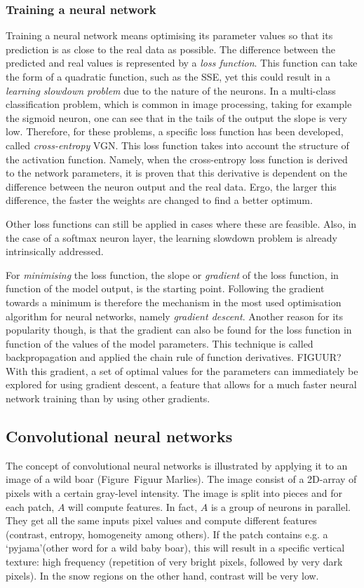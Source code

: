 \subsubsection{Training a neural network \label{subsubsec:training}}
Training a neural network means optimising its parameter values so that its prediction is as close to the real data as possible. The difference between the predicted and real values is represented by a \textit{loss function}. This function can take the form of a quadratic function, such as the SSE, yet this could result in a \textit{learning slowdown problem} due to the nature of the neurons. In a multi-class classification problem, which is common in image processing, taking for example the sigmoid neuron, one can see that in the tails of the output the slope is very low. Therefore, for these problems, a specific loss function has been developed, called \textit{cross-entropy} VGN. This loss function takes into account the structure of the activation function. Namely, when the cross-entropy loss function is derived to the network parameters, it is proven that this derivative is dependent on the difference between the neuron output and the real data. Ergo, the larger this difference, the faster the weights are changed to find a better optimum.


Other loss functions can still be applied in cases where these are feasible. Also, in the case of a softmax neuron layer, the learning slowdown problem is already intrinsically addressed.


For \textit{minimising} the loss function, the slope or \textit{gradient} of the loss function, in function of the model output, is the starting point. Following the gradient towards a minimum is therefore the mechanism in the most used optimisation algorithm for neural networks, namely \textit{gradient descent}. Another reason for its popularity though, is that the gradient can also be found for the loss function in function of the values of the model parameters. This technique is called backpropagation and applied the chain rule of function derivatives. FIGUUR? With this gradient, a set of optimal values for the parameters can immediately be explored for using gradient descent, a feature that allows for a much faster neural network training than by using other gradients.

\subsection{Convolutional neural networks \label{subsec:cnn}}
The concept of convolutional neural networks is illustrated by applying it to an image of a wild boar (Figure~Figuur Marlies). The image consist of a 2D-array of pixels with a certain gray-level intensity. The image is split into pieces and for each patch, $A$ will compute features. In fact, $A$ is a group of neurons in parallel. They get all the same inputs pixel values and compute different features (contrast, entropy, homogeneity among others). If the patch contains e.g. a \textquoteleft pyjama\textquoteright  (other word for a wild baby boar), this will result in a specific vertical texture: high frequency (repetition of very bright pixels, followed by very dark pixels). In the snow regions on the other hand, contrast will be very low.

